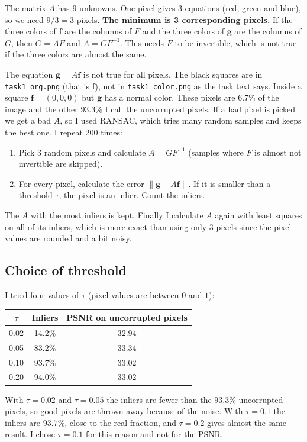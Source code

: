 \documentclass[11pt,a4paper]{article}
\begin{document}
The matrix $A$ has $9$ unknowns. One pixel gives $3$ equations (red, green and blue), so we need $9/3=3$ pixels.
\textbf{The minimum is 3 corresponding pixels.} If the three colors of $\bm f$ are the columns of $F$ and the
three colors of $\bm g$ are the columns of $G$, then $G=AF$ and $A=GF^{-1}$. This needs $F$ to be invertible,
which is not true if the three colors are almost the same.

The equation $\bm g=A\bm f$ is not true for all pixels. The black squares are in \texttt{task1\_org.png}
(that is $\bm f$), not in \texttt{task1\_color.png} as the task text says. Inside a square $\bm f=(0,0,0)$
but $\bm g$ has a normal color. These pixels are $6.7\%$ of the image and the other $93.3\%$ I call the
uncorrupted pixels. If a bad pixel is picked we get a bad $A$, so I used RANSAC, which tries many random samples
and keeps the best one. I repeat $200$ times:
\begin{enumerate}
  \item Pick $3$ random pixels and calculate $A=GF^{-1}$ (samples where $F$ is almost not invertible are skipped).
  \item For every pixel, calculate the error $\|\bm g-A\bm f\|$. If it is smaller than a threshold $\tau$,
    the pixel is an inlier. Count the inliers.
\end{enumerate}
The $A$ with the most inliers is kept. Finally I calculate $A$ again with least squares on all of its inliers,
which is more exact than using only $3$ pixels since the pixel values are rounded and a bit noisy.

\subsection{Choice of threshold}

I tried four values of $\tau$ (pixel values are between $0$ and $1$):

\begin{center}
\begin{tabular}{ccc}
 $\tau$ & Inliers & PSNR on uncorrupted pixels \\ \hline
 0.02 & 14.2\% & 32.94 \\
 0.05 & 83.2\% & 33.34 \\
 0.10 & 93.7\% & 33.02 \\
 0.20 & 94.0\% & 33.02 \\
\end{tabular}
\end{center}

With $\tau=0.02$ and $\tau=0.05$ the inliers are fewer than the $93.3\%$ uncorrupted pixels, so good pixels
are thrown away because of the noise. With $\tau=0.1$ the inliers are $93.7\%$, close to the real fraction, and
$\tau=0.2$ gives almost the same result. I chose $\tau=0.1$ for this reason and not for the PSNR.
\end{document}

